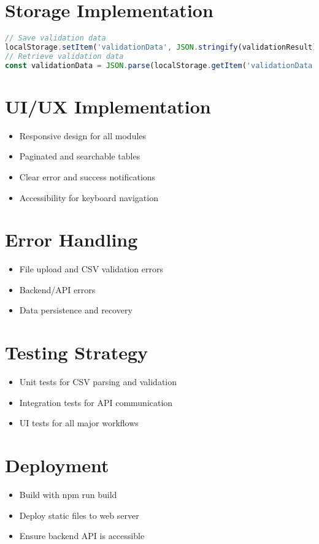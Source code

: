 \documentclass[12pt,a4paper]{article}
\begin{document}
\section{Storage Implementation}
\begin{lstlisting}[language=JavaScript]
// Save validation data
localStorage.setItem('validationData', JSON.stringify(validationResult));
// Retrieve validation data
const validationData = JSON.parse(localStorage.getItem('validationData'));
\end{lstlisting}

\section{UI/UX Implementation}
\begin{itemize}
    \item Responsive design for all modules
    \item Paginated and searchable tables
    \item Clear error and success notifications
    \item Accessibility for keyboard navigation
\end{itemize}

\section{Error Handling}
\begin{itemize}
    \item File upload and CSV validation errors
    \item Backend/API errors
    \item Data persistence and recovery
\end{itemize}

\section{Testing Strategy}
\begin{itemize}
    \item Unit tests for CSV parsing and validation
    \item Integration tests for API communication
    \item UI tests for all major workflows
\end{itemize}

\section{Deployment}
\begin{itemize}
    \item Build with npm run build
    \item Deploy static files to web server
    \item Ensure backend API is accessible
\end{itemize}
\end{document}
